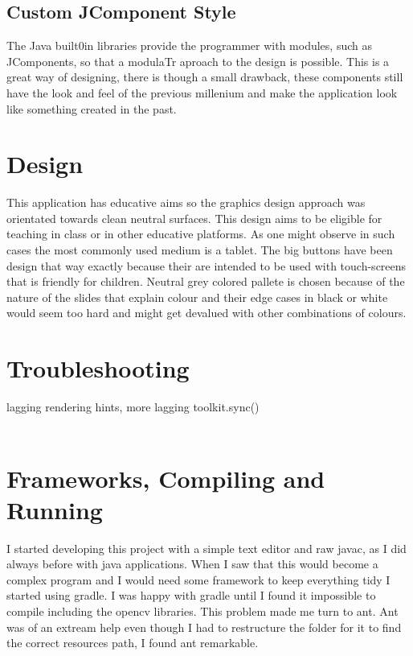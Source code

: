 \documentclass[a4paper, 11pt]{paper}
\begin{document}
\subsection{Custom JComponent Style}
\indent\par
The Java built0in libraries provide the programmer with modules, such as JComponents,
so that a modulaTr aproach to the design is possible. This is a great way of designing, there is though a small drawback,
these components still have the look and feel of the previous millenium and make the application look like something created in the past.

\section{Design}
This application has educative aims so the graphics design approach was orientated towards clean neutral surfaces.
This design aims to be eligible for teaching in class or in other educative platforms. As one might observe in
such cases the most commonly used medium is a tablet. The big buttons have been design that way exactly because their are
intended to be used with touch-screens that is friendly for children.
Neutral grey colored pallete is chosen because of the nature of the slides that explain colour and their edge cases in black or
white would seem too hard and might get devalued with other combinations of colours.
\section{Troubleshooting}
\indent\par
lagging rendering hints, more lagging toolkit.sync()\\
\\

\section{Frameworks, Compiling and Running}
\indent\par
I started developing this project with a simple text editor and raw javac, as I did always before with java applications.
When I saw that this would become a complex program and I would need some framework to keep everything tidy I started using gradle.
I was happy with gradle until I found it impossible to compile including the opencv libraries. This problem made me turn to ant.
Ant was of an extream help even though I had to restructure the folder for it to find the correct resources path, I found ant remarkable.\\
\end{document}
